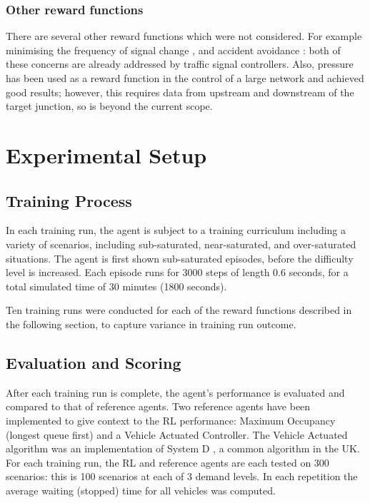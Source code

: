 \documentclass{article}
\begin{document}
\subsubsection{Other reward functions}
There are several other reward functions which were not considered. For example minimising the frequency of signal change \cite{vanderpol2016} \cite{wei2018}, and accident avoidance \cite{vanderpol2016}: both of these concerns are already addressed by traffic signal controllers. Also, pressure has been used as a reward function in the control of a large network \cite{wei2019a} \cite{yau} \cite{wei2019} \cite{varaiya2013} \cite{wei2018}  \cite{chen2020} and achieved good results; however, this requires data from upstream and downstream of the target junction, so is beyond the current scope.

\section{Experimental Setup}\label{exp_setup}
\subsection{Training Process}

In each training run, the agent is subject to a training curriculum including a variety of scenarios, including sub-saturated, near-saturated, and over-saturated situations. The agent is first shown sub-saturated episodes, before the difficulty level is increased. Each episode runs for 3000 steps of length 0.6 seconds, for a total simulated time of 30 minutes (1800 seconds).

Ten training runs were conducted for each of the reward functions described in the following section, to capture variance in training run outcome.

\subsection{Evaluation and Scoring}
After each training run is complete, the agent's performance is evaluated and compared to that of reference agents. Two reference agents have been implemented to give context to the RL performance: Maximum Occupancy (longest queue first) and a Vehicle Actuated Controller. The Vehicle Actuated algorithm was an implementation of System D \cite{highways}, a common algorithm in the UK.  For each training run, the RL and reference agents are each tested on 300 scenarios: this is 100 scenarios at each of 3 demand levels. In each repetition the average waiting (stopped) time for all vehicles was computed.
\end{document}
